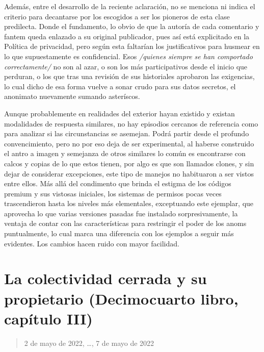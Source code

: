 \documentclass[
]{book}
\begin{document}
Además, entre el desarrollo de la reciente aclaración, no se menciona ni indica el criterio para decantarse por los escogidos a ser los pioneros de esta clase predilecta. Donde el fundamento, lo obvio de que la autoría de cada comentario y fantem queda enlazado a su original publicador, pues así está explicitado en la Política de privacidad, pero según esta faltarían los justificativos para husmear en lo que supuestamente es confidencial. Esos \emph{/quienes siempre se han comportado correctamente/} no son al azar, o son los más participativos desde el inicio que perduran, o los que tras una revisión de sus historiales aprobaron las exigencias, lo cual dicho de esa forma vuelve a sonar crudo para sus datos secretos, el anonimato nuevamente sumando asteríscos.

Aunque probablemente en realidades del exterior hayan existido y existan modalidades de respuesta similares, no hay episodios cercanos de referencia como para analizar si las circunstancias se asemejan. Podrá partir desde el profundo convencimiento, pero no por eso deja de ser experimental, al haberse construido el antro a imagen y semejanza de otros similares lo común es encontrarse con calcos y copias de lo que estos tienen, por algo es que son llamados clones, y sin dejar de considerar excepciones, este tipo de manejos no habituaron a ser vistos entre ellos. Más allá del condimento que brinda el estigma de los códigos premium y sus vistosas iniciales, los sistemas de permisos pocas veces trascendieron hasta los niveles más elementales, exceptuando este ejemplar, que aprovecha lo que varias versiones pasadas fue instalado sorpresivamente, la ventaja de contar con las características para restringir el poder de los anoms puntualmente, lo cual marca una diferencia con los ejemplos a seguir más evidentes. Los cambios hacen ruido con mayor facilidad.

\hypertarget{la-colectividad-cerrada-y-su-propietario-decimocuarto-libro-capuxedtulo-iii}{%
\section{La colectividad cerrada y su propietario (Decimocuarto libro, capítulo III)}\label{la-colectividad-cerrada-y-su-propietario-decimocuarto-libro-capuxedtulo-iii}}

\begin{quote}
2 de mayo de 2022, \ldots, 7 de mayo de 2022
\end{quote}
\end{document}

